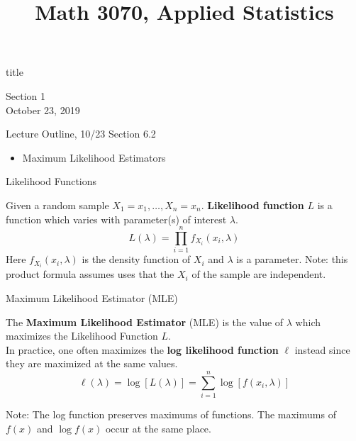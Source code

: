\documentclass[t,handout]{beamer}
\title{Math 3070, Applied Statistics}
\newcommand{\nl}[1]{\vspace{#1 em}}
\begin{document}
\begin{frame}[c]
    \begin{beamercolorbox}[rounded=true,wd=\textwidth,center]{title}
        \inserttitle
    \end{beamercolorbox}
    \begin{center}
        Section 1\\
        \nl{0.5}
        October 23, 2019
    \end{center}
\end{frame}
\begin{frame}[c]{Lecture Outline, 10/23}
    Section 6.2
    \begin{itemize}
        \item Maximum Likelihood Estimators
    \end{itemize}
\end{frame}
\begin{frame}{Likelihood Functions}
    \begin{block}{}
        Given a random sample $X_1=x_1, \ldots, X_n=x_n$. \textbf{Likelihood function} $L$ is a function which varies with parameter(s) of interest $\lambda$.
        $$ L(\lambda) = \prod_{i=1}^n f_{X_i}(x_i,\lambda) $$
        Here $f_{X_i}(x_i,\lambda)$ is the density function of $X_i$ and $\lambda$ is a parameter. Note: this product formula assumes uses that the $X_i$ of the sample are independent.
    \end{block}
\end{frame}
\begin{frame}{Maximum Likelihood Estimator (MLE)}
    \begin{block}{}
        The \textbf{Maximum Likelihood Estimator} (MLE) is the value of $\lambda$ which maximizes the Likelihood Function $L$.\\
        \nl{0.5}
        In practice, one often maximizes the \textbf{log likelihood function} $\ell$ instead since they are maximized at the same values.
        $$ \ell(\lambda) = \log [L(\lambda)] = \sum_{i=1}^n \log[ f(x_i,\lambda) ] $$
    \end{block}
    Note: The log function preserves maximums of functions. The maximums of $f(x)$ and $\log f(x)$ occur at the same place.
\end{frame}
\end{document}
